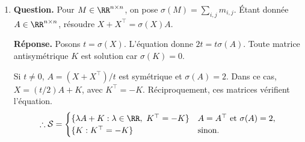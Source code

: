 \documentclass[12pt, a4paper]{article}
\begin{document}
\begin{enumerate}[label=4.\arabic*., start=60]
\begin{minipage}[t]{\linewidth}
\begin{enumerate}[\arabic*.]
\end{enumerate}
\end{minipage}

  \item \begin{minipage}[t]{\linewidth}\raggedright
\textbf{Question.} Pour $M\in\RR^{n\times n}$, on pose $\sigma(M)=\sum_{i,j}m_{i,j}$. Étant donnée $A\in\RR^{n\times n}$, résoudre $X+X^\top=\sigma(X)A$.
\par\smallskip
\textbf{Réponse.} Posons $t=\sigma(X)$. L'équation donne $2t=t\sigma(A)$.
    Toute matrice antisymétrique $K$ est solution car $\sigma(K)=0$.

    Si $t\neq0$, $A=(X+X^\top)/t$ est symétrique et $\sigma(A)=2$.
    Dans ce cas, $X=(t/2)A+K$, avec $K^\top=-K$.
    Réciproquement, ces matrices vérifient l'équation.
    \[
      \therefore\mathcal S=\begin{cases}
        \{\lambda A+K:\lambda\in\RR,\ K^\top=-K\}&A=A^\top\text{ et }\sigma(A)=2,\\
        \{K:K^\top=-K\}&\text{sinon.}
      \end{cases}
    \]
\end{minipage}

\end{enumerate}
\end{document}
